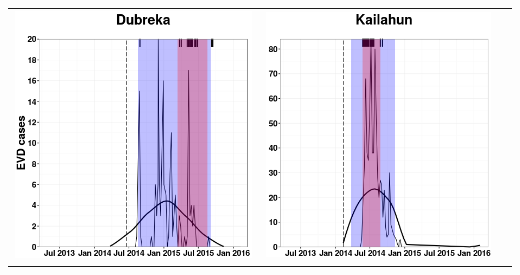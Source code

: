 \documentclass[portrait,a0paper,fontscale=0.3085]{baposter}
\begin{document}
\begin{poster}
{\begin{tabular}{ccc}
 \includegraphics[scale=0.34,valign=c]{images/maxCases_Dubreka.png} &
 \includegraphics[scale=0.34,valign=c]{images/maxCases_Kailahun.png}&

\end{tabular}}
\end{poster}
\end{document}
